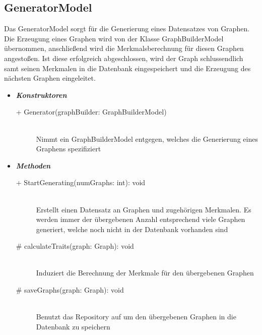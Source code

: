 \documentclass[13pt]{scrreprt}
\begin{document}
	\subsection{GeneratorModel}
	Das GeneratorModel sorgt für die Generierung eines Datensatzes von Graphen. Die Erzeugung eines Graphen wird von der Klasse GraphBuilderModel übernommen, anschließend wird die Merkmalsberechnung für diesen Graphen angestoßen. Ist diese erfolgreich abgeschlossen, wird der Graph schlussendlich samt seinen Merkmalen in die Datenbank eingespeichert und die Erzeugung des nächsten Graphen eingeleitet.
	\begin{itemize}[label = {$\circ$}]
		\item {\large \textbf{\textit{Konstruktoren}}\par}
		\begin{description}
			\item [+ Generator(graphBuilder: GraphBuilderModel)] \hfill \\ Nimmt ein GraphBuilderModel entgegen, welches die Generierung eines Graphens spezifiziert
		\end{description}
		\item {\large \textbf{\textit{Methoden}}\par}
		\begin{description}
			\item [+ StartGenerating(numGraphs: int): void] \hfill \\ Erstellt einen Datensatz an Graphen und zugehörigen Merkmalen. Es werden immer der übergebenen Anzahl entsprechend viele Graphen generiert, welche noch nicht in der Datenbank vorhanden sind
			\item [\# calculateTraits(graph: Graph): void] \hfill \\ Induziert die Berechnung der Merkmale für den übergebenen Graphen
			\item [\# saveGraphs(graph: Graph): void] \hfill \\ Benutzt das Repository auf um den übergebenen Graphen in die Datenbank zu speichern
		\end{description}
	\end{itemize}
	\newpage
\end{document}
